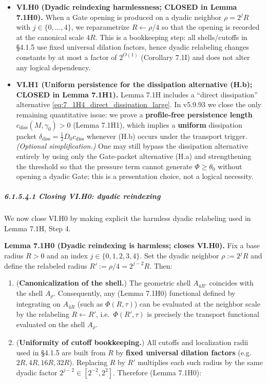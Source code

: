 \documentclass[
  11pt,
]{article}
\begin{document}
\begin{itemize}
\item
  \textbf{VI.H0 (Dyadic reindexing harmlessness; CLOSED in Lemma 7.1H0).} When a Gate opening is produced on a dyadic neighbor \(\rho=2^jR\) with \(j\in\{0,\dots,4\}\), we reparametrize \(R\leftarrow \rho/4\) so that the opening is recorded at the canonical scale \(4R\). This is a bookkeeping step: all shells/cutoffs in §4.1.5 use fixed universal dilation factors, hence dyadic relabeling changes constants by at most a factor of \(2^{O(1)}\) (Corollary 7.1I) and does not alter any logical dependency.
\item
  \textbf{VI.H1 (Uniform persistence for the dissipation alternative (H.b); CLOSED in Lemma 7.1H1).} Lemma 7.1H includes a ``direct dissipation'' alternative \eqref{eq:7_1H4_direct_dissipation_large}. In v5.9.93 we close the only remaining quantitative issue: we prove a \textbf{profile-free persistence length} \(c_{\mathrm{diss}}(M,\gamma_0)>0\) (Lemma 7.1H1), which implies a \textbf{uniform} dissipation packet \(\delta_{\mathrm{diss}}=\tfrac12 D_0 c_{\mathrm{diss}}\) whenever (H.b) occurs under the transport trigger. \emph{(Optional simplification.)} One may still bypass the dissipation alternative entirely by using only the Gate-packet alternative (H.a) and strengthening the threshold so that the pressure term cannot generate \(\Phi\ge\theta_0\) without opening a dyadic Gate; this is a presentation choice, not a logical necessity.
\end{itemize}

\hypertarget{closing-vi.h0-dyadic-reindexing}{%
\subparagraph{6.1.5.4.1 Closing VI.H0: dyadic reindexing}\label{closing-vi.h0-dyadic-reindexing}}

We now close VI.H0 by making explicit the harmless dyadic relabeling used in Lemma 7.1H, Step 4.

\textbf{Lemma 7.1H0 (Dyadic reindexing is harmless; closes VI.H0).} Fix a base radius \(R>0\) and an index \(j\in\{0,1,2,3,4\}\). Set the dyadic neighbor \(\rho:=2^jR\) and define the relabeled radius \(R':=\rho/4=2^{j-2}R\). Then:

\begin{enumerate}
\def\labelenumi{\arabic{enumi}.}
\item
  (\textbf{Canonicalization of the shell.}) The geometric shell \(A_{4R'}\) coincides with the shell \(A_{\rho}\). Consequently, any (Lemma 7.1H0) functional defined by integrating on \(A_{4R}\) (such as \(\Phi(R,\tau)\)) can be evaluated at the neighbor scale by the relabeling \(R\leftarrow R'\), i.e.~\(\Phi(R',\tau)\) is precisely the transport functional evaluated on the shell \(A_{\rho}\).
\item
  (\textbf{Uniformity of cutoff bookkeeping.}) All cutoffs and localization radii used in §4.1.5 are built from \(R\) by \textbf{fixed universal dilation factors} (e.g.~\(2R,4R,16R,32R\)). Replacing \(R\) by \(R'\) multiplies each such radius by the same dyadic factor \(2^{j-2}\in[2^{-2},2^{2}]\). Therefore (Lemma 7.1H0):
\end{enumerate}
\end{document}
